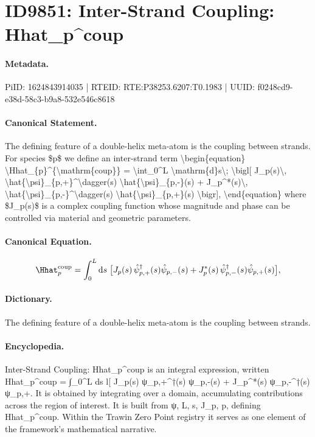 \section*{ID9851: Inter-Strand Coupling: Hhat\_p\textasciicircum{}coup}
\paragraph{Metadata.}
PiID: 1624843914035 | RTEID: RTE:P38253.6207:T0.1983 | UUID: f0248cd9-e38d-58c3-b9a8-532e546c8618

\paragraph{Canonical Statement.}
The defining feature of a double-helix meta-atom is the coupling between strands. For species \$p\$ we define an inter-strand term \textbackslash{}begin\{equation\} \textbackslash{}Hhat\_\{p\}\textasciicircum{}\{\textbackslash{}mathrm\{coup\}\} = \textbackslash{}int\_0\textasciicircum{}L \textbackslash{}mathrm\{d\}s\textbackslash{}; \textbackslash{}bigl[ J\_p(s)\textbackslash{}, \textbackslash{}hat\{\textbackslash{}psi\}\_\{p,+\}\textasciicircum{}\textbackslash{}dagger(s) \textbackslash{}hat\{\textbackslash{}psi\}\_\{p,-\}(s) + J\_p\textasciicircum{}*(s)\textbackslash{}, \textbackslash{}hat\{\textbackslash{}psi\}\_\{p,-\}\textasciicircum{}\textbackslash{}dagger(s) \textbackslash{}hat\{\textbackslash{}psi\}\_\{p,+\}(s) \textbackslash{}bigr], \textbackslash{}end\{equation\} where \$J\_p(s)\$ is a complex coupling function whose magnitude and phase can be controlled via material and geometric parameters.

\paragraph{Canonical Equation.}
\[
\Hhat_{p}^{\mathrm{coup}} = \int_0^L \mathrm{d}s\; \bigl[ J_p(s)\, \hat{\psi}_{p,+}^\dagger(s) \hat{\psi}_{p,-}(s) + J_p^*(s)\, \hat{\psi}_{p,-}^\dagger(s) \hat{\psi}_{p,+}(s) \bigr],
\]

\paragraph{Dictionary.}
The defining feature of a double-helix meta-atom is the coupling between strands.

\paragraph{Encyclopedia.}
Inter-Strand Coupling: Hhat\_p\textasciicircum{}coup is an integral expression, written Hhat\_p\textasciicircum{}coup = ∫\_0\textasciicircum{}L ds l[ J\_p(s) ψ\_p,+\textasciicircum{}†(s) ψ\_p,-(s) + J\_p\textasciicircum{}*(s) ψ\_p,-\textasciicircum{}†(s) ψ\_p,+. It is obtained by integrating over a domain, accumulating contributions across the region of interest. It is built from ψ, L, s, J\_p, p, defining Hhat\_p\textasciicircum{}coup. Within the Trawin Zero Point registry it serves as one element of the framework's mathematical narrative.
